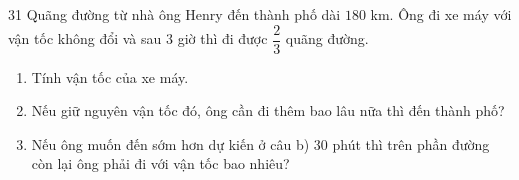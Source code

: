 \providecommand{\rvabBox}[4]{\begin{tikzpicture}[baseline=-0.7ex,font=\small]
  \path (-0.66,-0.42) rectangle (0.66,0.42);
  \draw[Navy,line width=0.8pt,fill=tmBlue!6] (-0.66,-0.32) rectangle (0.66,0.32);
  \draw[Navy,line width=0.8pt] (0,-0.32)--(0,0.32) (-0.66,0)--(0.66,0);
  \node[inner sep=0pt] at (-0.33,0.16){$#1$};\node[inner sep=0pt] at (0.33,0.16){$#2$};
  \node[inner sep=0pt] at (-0.33,-0.16){$#3$};\node[inner sep=0pt] at (0.33,-0.16){$#4$};\end{tikzpicture}}

\clearpage
{}

\begin{probbox}{31}{\relax}
Quãng đường từ nhà ông Henry đến thành phố dài $180$ km. Ông đi xe máy với vận tốc không đổi và sau $3$ giờ thì đi được
$\dfrac{2}{3}$ quãng đường.
\begin{enumerate}[label=\alph*),leftmargin=1.6em,itemsep=1pt,topsep=2pt]
\item Tính vận tốc của xe máy.
\item Nếu giữ nguyên vận tốc đó, ông cần đi thêm bao lâu nữa thì đến thành phố?
\item Nếu ông muốn đến sớm hơn dự kiến ở câu b) $30$ phút thì trên phần đường còn lại ông phải đi với vận tốc bao nhiêu?
\end{enumerate}
\end{probbox}
